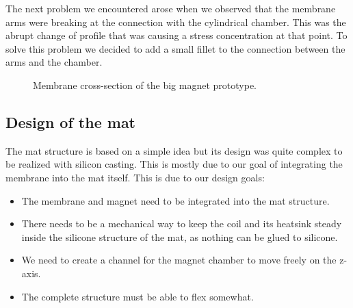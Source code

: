 The next problem we encountered arose when we observed that the membrane arms were breaking at the connection with the cylindrical chamber.
This was the abrupt change of profile that was causing a stress concentration at that point.
To solve this problem we decided to add a small fillet to the connection between the arms and the chamber.
\begin{figure}
    \centering
    \caption{Membrane cross-section of the big magnet prototype.}
    \label{fig: Membrane_v2_section}
\end{figure}

\subsection{Design of the mat}
The mat structure is based on a simple idea but its design was quite complex to be realized with silicon casting. This is mostly due to our goal of integrating the membrane into the mat itself.
This is due to our design goals:
\begin{itemize}
    \item The membrane and magnet need to be integrated into the mat structure.
    \item There needs to be a mechanical way to keep the coil and its heatsink steady inside the silicone structure of the mat, as nothing can be glued to silicone.
    \item We need to create a channel for the magnet chamber to move freely on the z-axis.
    \item The complete structure must be able to flex somewhat.
\end{itemize}

